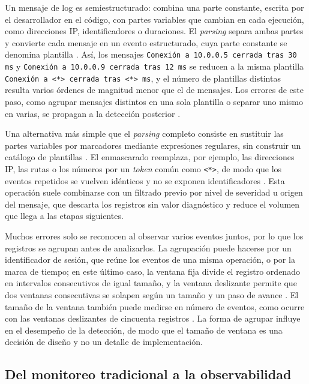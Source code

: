Un mensaje de log es semiestructurado: combina una parte constante, escrita por el desarrollador en el código, con partes variables que cambian en cada ejecución, como direcciones IP, identificadores o duraciones. El \textit{parsing} separa ambas partes y convierte cada mensaje en un evento estructurado, cuya parte constante se denomina plantilla \cite{he2021_survey}. Así, los mensajes \texttt{Conexión a 10.0.0.5 cerrada tras 30 ms} y \texttt{Conexión a 10.0.0.9 cerrada tras 12 ms} se reducen a la misma plantilla \texttt{Conexión a <*> cerrada tras <*> ms}, y el número de plantillas distintas resulta varios órdenes de magnitud menor que el de mensajes. Los errores de este paso, como agrupar mensajes distintos en una sola plantilla o separar uno mismo en varias, se propagan a la detección posterior \cite{sun2026_parsing}.

Una alternativa más simple que el \textit{parsing} completo consiste en sustituir las partes variables por marcadores mediante expresiones regulares, sin construir un catálogo de plantillas \cite{murphy2024_embeddings}. El enmascarado reemplaza, por ejemplo, las direcciones IP, las rutas o los números por un \textit{token} común como \texttt{<*>}, de modo que los eventos repetidos se vuelven idénticos y no se exponen identificadores \cite{guan2024_logllm}. Esta operación suele combinarse con un filtrado previo por nivel de severidad u origen del mensaje, que descarta los registros sin valor diagnóstico y reduce el volumen que llega a las etapas siguientes.

Muchos errores solo se reconocen al observar varios eventos juntos, por lo que los registros se agrupan antes de analizarlos. La agrupación puede hacerse por un identificador de sesión, que reúne los eventos de una misma operación, o por la marca de tiempo; en este último caso, la ventana fija divide el registro ordenado en intervalos consecutivos de igual tamaño, y la ventana deslizante permite que dos ventanas consecutivas se solapen según un tamaño y un paso de avance \cite{he2021_survey}. El tamaño de la ventana también puede medirse en número de eventos, como ocurre con las ventanas deslizantes de cincuenta registros \cite{lim2025_logadreft}. La forma de agrupar influye en el desempeño de la detección, de modo que el tamaño de ventana es una decisión de diseño y no un detalle de implementación.

\subsection{Del monitoreo tradicional a la observabilidad}\label{sec:ant_observabilidad}

